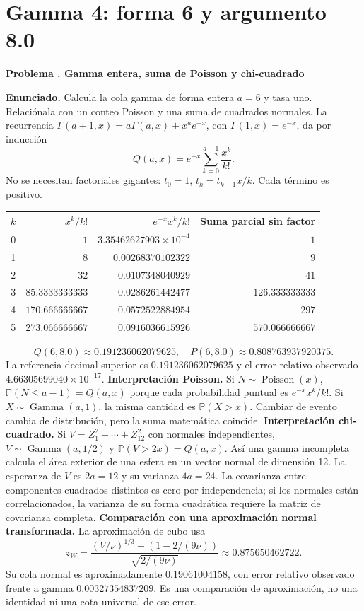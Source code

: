 \documentclass[11pt,a4paper]{article}
\newcommand{\Prob}{\mathbb P}
\theoremstyle{definition}
\newcounter{problema}
\newenvironment{resuelto}[1]{\refstepcounter{problema}\par\medskip\Needspace{6\baselineskip}\textbf{Problema \theproblema. #1}\par}{\par\medskip}
\begin{document}
\section{Gamma 4: forma 6 y argumento 8.0}
\begin{resuelto}{Gamma entera, suma de Poisson y chi-cuadrado}
\textbf{Enunciado.} Calcula la cola gamma de forma entera $a=6$ y tasa uno. Relaciónala con un conteo Poisson y una suma de cuadrados normales.
La recurrencia $\Gamma(a+1,x)=a\Gamma(a,x)+x^ae^{-x}$, con $\Gamma(1,x)=e^{-x}$, da por inducción
\[
Q(a,x)=e^{-x}\sum_{k=0}^{a-1}\frac{x^k}{k!}.
\]
No se necesitan factoriales gigantes: $t_0=1$, $t_k=t_{k-1}x/k$. Cada término es positivo.

\begin{center}\small\begin{tabular}{rrrr}
\toprule
$k$&$x^k/k!$&$e^{-x}x^k/k!$&Suma parcial sin factor\\
\midrule
0&$1$&$3.35462627903\times10^{-4}$&$1$\\
1&$8$&$0.00268370102322$&$9$\\
2&$32$&$0.0107348040929$&$41$\\
3&$85.3333333333$&$0.0286261442477$&$126.333333333$\\
4&$170.666666667$&$0.0572522884954$&$297$\\
5&$273.066666667$&$0.0916036615926$&$570.066666667$\\
\bottomrule\end{tabular}\end{center}
\[
Q(6,8.0)\approx0.191236062079625,\quad
P(6,8.0)\approx0.808763937920375.
\]
La referencia decimal superior es $0.191236062079625$ y el error relativo observado $4.66305699040\times10^{-17}$.
\textbf{Interpretación Poisson.} Si $N\sim\operatorname{Poisson}(x)$, $\Prob(N\le a-1)=Q(a,x)$ porque cada probabilidad puntual es $e^{-x}x^k/k!$. Si $X\sim\operatorname{Gamma}(a,1)$, la misma cantidad es $\Prob(X>x)$. Cambiar de evento cambia de distribución, pero la suma matemática coincide.
\textbf{Interpretación chi-cuadrado.} Si $V=Z_1^2+\cdots+Z_{12}^2$ con normales independientes, $V\sim\operatorname{Gamma}(a,1/2)$ y $\Prob(V>2x)=Q(a,x)$. Así una gamma incompleta calcula el área exterior de una esfera en un vector normal de dimensión 12.
La esperanza de $V$ es $2a=12$ y su varianza $4a=24$. La covarianza entre componentes cuadrados distintos es cero por independencia; si los normales están correlacionados, la varianza de su forma cuadrática requiere la matriz de covarianza completa.
\textbf{Comparación con una aproximación normal transformada.} La aproximación de cubo usa
\[
z_W=\frac{(V/\nu)^{1/3}-(1-2/(9\nu))}{\sqrt{2/(9\nu)}}\approx0.875650462722.
\]
Su cola normal es aproximadamente $0.19061004158$, con error relativo observado frente a gamma $0.00327354837209$. Es una comparación de aproximación, no una identidad ni una cota universal de ese error.
\end{resuelto}
\end{document}
